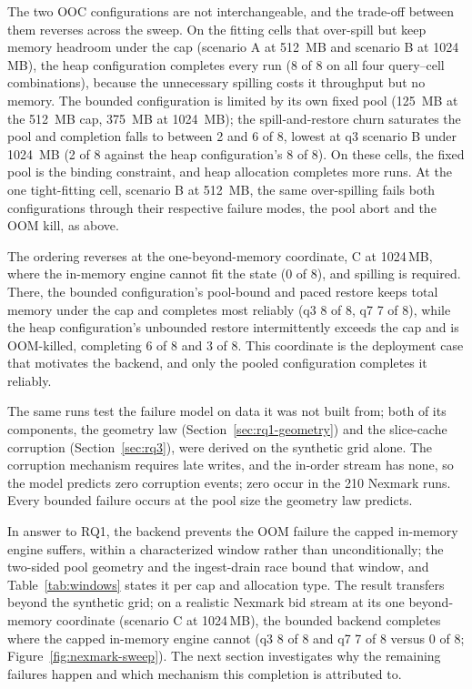 The two \ac{OOC} configurations are not interchangeable, and the trade-off between them reverses across the sweep.
On the fitting cells that over-spill but keep memory headroom under the cap (scenario A at 512\, MB and scenario B at 1024\, MB), the heap configuration completes every run (8 of 8 on all four query--cell combinations), because the unnecessary spilling costs it throughput but no memory.
The bounded configuration is limited by its own fixed pool (125\, MB at the 512\, MB cap, 375\, MB at 1024\, MB); the spill-and-restore churn saturates the pool and completion falls to between 2 and 6 of 8, lowest at q3 scenario B under 1024\, MB (2 of 8 against the heap configuration's 8 of 8).
On these cells, the fixed pool is the binding constraint, and heap allocation completes more runs.
At the one tight-fitting cell, scenario B at 512\, MB, the same over-spilling fails both configurations through their respective failure modes, the pool abort and the OOM kill, as above.

The ordering reverses at the one-beyond-memory coordinate, C at 1024\,MB, where the in-memory engine cannot fit the state (0 of 8), and spilling is required.
There, the bounded configuration's pool-bound and paced restore keeps total memory under the cap and completes most reliably (q3 8 of 8, q7 7 of 8), while the heap configuration's unbounded restore intermittently exceeds the cap and is OOM-killed, completing 6 of 8 and 3 of 8.
This coordinate is the deployment case that motivates the backend, and only the pooled configuration completes it reliably.

The same runs test the failure model on data it was not built from; both of its components, the geometry law (Section~\ref{sec:rq1-geometry}) and the slice-cache corruption (Section~\ref{sec:rq3}), were derived on the synthetic grid alone.
The corruption mechanism requires late writes, and the in-order stream has none, so the model predicts zero corruption events; zero occur in the 210 Nexmark runs.
Every bounded failure occurs at the pool size the geometry law predicts.


In answer to RQ1, the backend prevents the OOM failure the capped in-memory engine suffers, within a characterized window rather than unconditionally; the two-sided pool geometry and the ingest-drain race bound that window, and Table~\ref{tab:windows} states it per cap and allocation type.
The result transfers beyond the synthetic grid; on a realistic Nexmark bid stream at its one beyond-memory coordinate (scenario C at 1024\,MB), the bounded backend completes where the capped in-memory engine cannot (q3 8 of 8 and q7 7 of 8 versus 0 of 8; Figure~\ref{fig:nexmark-sweep}).
The next section investigates why the remaining failures happen and which mechanism this completion is attributed to.

